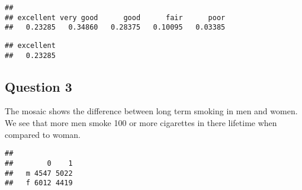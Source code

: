 \documentclass[]{article}
\newenvironment{Shaded}{\begin{snugshade}}{\end{snugshade}}
\newcommand{\DataTypeTok}[1]{\textcolor[rgb]{0.13,0.29,0.53}{#1}}
\newcommand{\DecValTok}[1]{\textcolor[rgb]{0.00,0.00,0.81}{#1}}
\newcommand{\KeywordTok}[1]{\textcolor[rgb]{0.13,0.29,0.53}{\textbf{#1}}}
\newcommand{\NormalTok}[1]{#1}
\newcommand{\OperatorTok}[1]{\textcolor[rgb]{0.81,0.36,0.00}{\textbf{#1}}}
\newcommand{\StringTok}[1]{\textcolor[rgb]{0.31,0.60,0.02}{#1}}
\begin{document}
\begin{verbatim}
## 
## excellent very good      good      fair      poor 
##   0.23285   0.34860   0.28375   0.10095   0.03385
\end{verbatim}

\begin{Shaded}
\end{Shaded}

\begin{verbatim}
## excellent 
##   0.23285
\end{verbatim}

\hypertarget{question-3}{%
\subsection{Question 3}\label{question-3}}

The mosaic shows the difference between long term smoking in men and
women. We see that more men smoke 100 or more cigarettes in there
lifetime when compared to woman.

\begin{Shaded}
\end{Shaded}

\begin{verbatim}
##    
##        0    1
##   m 4547 5022
##   f 6012 4419
\end{verbatim}

\begin{Shaded}
\end{Shaded}
\end{document}

